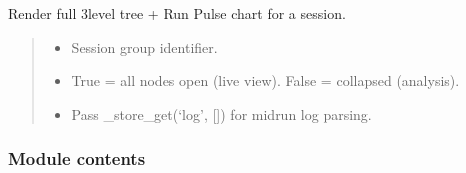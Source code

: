 \documentclass[letterpaper,10pt,english]{sphinxmanual}
\begin{document}
\begin{fulllineitems}
\label{\detokenize{gui.components.session_tree:gui.components.session_tree.render_session_tree}}
\pysigstartsignatures
\pysiglinewithargsret
{}
{\sphinxparamcomma {}\sphinxparamcomma {}\sphinxparamcomma {}}
{}
\pysigstopsignatures
\sphinxAtStartPar
Render full 3\sphinxhyphen{}level tree + Run Pulse chart for a session.
\begin{quote}\begin{description}
\begin{itemize}
\item {} 
\sphinxAtStartPar
{} \textendash{} Session group identifier.

\item {} 
\sphinxAtStartPar
{} \textendash{} True = all nodes open (live view). False = collapsed (analysis).

\item {} 
\sphinxAtStartPar
{} \textendash{} Pass \_store\_get(‘log’, {[}{]}) for mid\sphinxhyphen{}run log parsing.

\end{itemize}

\end{description}\end{quote}

\end{fulllineitems}



\subsubsection{Module contents}
\label{\detokenize{gui.components:module-gui.components}}\label{\detokenize{gui.components:module-contents}}
\sphinxstepscope
\end{document}
